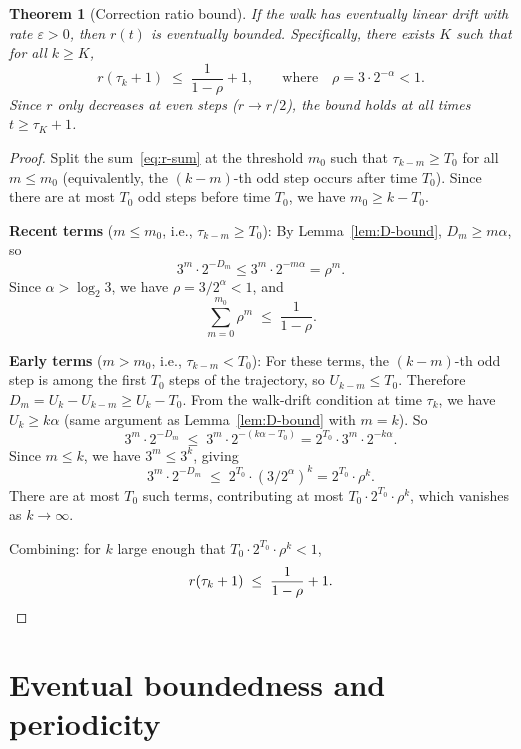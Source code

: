 \documentclass[11pt,a4paper]{article}
\theoremstyle{plain}
\newtheorem{theorem}{Theorem}[section]
\theoremstyle{definition}
\begin{document}
\begin{theorem}[Correction ratio bound]\label{thm:r-bound}
If the walk has eventually linear drift with rate $\varepsilon > 0$,
then $r(t)$ is eventually bounded.  Specifically, there exists
$K$ such that for all $k \ge K$,
\[
  r(\tau_k + 1) \;\le\; \frac{1}{1 - \rho} + 1,
  \qquad\text{where}\quad
  \rho = 3 \cdot 2^{-\alpha} < 1.
\]
Since $r$ only decreases at even steps ($r \to r/2$), the bound
holds at all times $t \ge \tau_K + 1$.
\end{theorem}

\begin{proof}
Split the sum~\eqref{eq:r-sum} at the threshold $m_0$ such that
$\tau_{k-m} \ge T_0$ for all $m \le m_0$ (equivalently, the
$(k{-}m)$-th odd step occurs after time $T_0$).  Since there are
at most $T_0$ odd steps before time $T_0$, we have $m_0 \ge k - T_0$.

\medskip\noindent
\textbf{Recent terms} ($m \le m_0$, i.e., $\tau_{k-m} \ge T_0$):
By Lemma~\ref{lem:D-bound}, $D_m \ge m\alpha$, so
\[
  3^m \cdot 2^{-D_m} \le 3^m \cdot 2^{-m\alpha} = \rho^m.
\]
Since $\alpha > \log_2 3$, we have $\rho = 3/2^\alpha < 1$, and
\[
  \sum_{m=0}^{m_0} \rho^m \;\le\; \frac{1}{1 - \rho}.
\]

\medskip\noindent
\textbf{Early terms} ($m > m_0$, i.e., $\tau_{k-m} < T_0$):
For these terms, the $(k{-}m)$-th odd step is among the first $T_0$
steps of the trajectory, so $U_{k-m} \le T_0$.  Therefore
$D_m = U_k - U_{k-m} \ge U_k - T_0$.  From the walk-drift condition
at time $\tau_k$, we have $U_k \ge k\alpha$ (same argument as
Lemma~\ref{lem:D-bound} with $m = k$).  So
\[
  3^m \cdot 2^{-D_m}
  \;\le\; 3^m \cdot 2^{-(k\alpha - T_0)}
  = 2^{T_0} \cdot 3^m \cdot 2^{-k\alpha}.
\]
Since $m \le k$, we have $3^m \le 3^k$, giving
\[
  3^m \cdot 2^{-D_m}
  \;\le\; 2^{T_0} \cdot (3/2^\alpha)^k
  = 2^{T_0} \cdot \rho^k.
\]
There are at most $T_0$ such terms, contributing at most
$T_0 \cdot 2^{T_0} \cdot \rho^k$, which vanishes as $k \to \infty$.

\medskip
Combining: for $k$ large enough that
$T_0 \cdot 2^{T_0} \cdot \rho^k < 1$,
\[
  r(\tau_k + 1) \;\le\; \frac{1}{1-\rho} + 1. \qedhere
\]
\end{proof}

\section{Eventual boundedness and periodicity}
\end{document}
